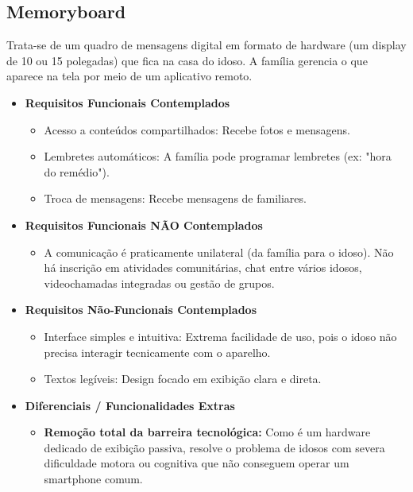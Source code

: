 \subsection{Memoryboard}
Trata-se de um quadro de mensagens digital em formato de hardware (um display de 10 ou 15 polegadas) que fica na casa do idoso. A família gerencia o que aparece na tela por meio de um aplicativo remoto.

\begin{itemize}
    \item \textbf{Requisitos Funcionais Contemplados}
        \begin{itemize}
            \item Acesso a conteúdos compartilhados: Recebe fotos e mensagens.
            \item Lembretes automáticos: A família pode programar lembretes (ex: "hora do remédio").
            \item Troca de mensagens: Recebe mensagens de familiares.
        \end{itemize}
    \item \textbf{Requisitos Funcionais NÃO Contemplados}
        \begin{itemize}
            \item A comunicação é praticamente unilateral (da família para o idoso). Não há inscrição em atividades comunitárias, chat entre vários idosos, videochamadas integradas ou gestão de grupos.
        \end{itemize}
    \item \textbf{Requisitos Não-Funcionais Contemplados}
        \begin{itemize}
            \item Interface simples e intuitiva: Extrema facilidade de uso, pois o idoso não precisa interagir tecnicamente com o aparelho.
            \item Textos legíveis: Design focado em exibição clara e direta.
        \end{itemize}
    \item \textbf{Diferenciais / Funcionalidades Extras}
        \begin{itemize}
            \item \textbf{Remoção total da barreira tecnológica:} Como é um hardware dedicado de exibição passiva, resolve o problema de idosos com severa dificuldade motora ou cognitiva que não conseguem operar um smartphone comum.
        \end{itemize}
\end{itemize}

